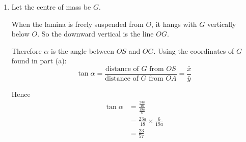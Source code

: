 \documentclass[leqno]{article}
\begin{document}
\begin{enumerate}[
  label=\textbf{\arabic*.},
  leftmargin=*,
  topsep=0pt,
  partopsep=0pt,
  parsep=0pt
]
\begin{djsSolution}
\begin{enumerate}[label=\textbf{(\alph*)}, start=1]
  where \(\mathcal{A}=\sum\mathcal{A}_i\).

  The total area is
  \[
  \mathcal{A}=5a^2+3a^2+a^2=9a^2
  \]

  \begin{enumerate}[label=\textbf{(\roman*)}, start=1]
    \item The distance from \(OS\) is \(\bar x\). Taking moments about \(OS\):
    \begin{align*}
    \mathcal{A}\bar x
    &=5a^2\left(\frac{a}{2}\right)+3a^2\left(\frac{5a}{2}\right)+a^2\left(\frac{3a}{2}\right)\\
    &=\frac{5a^3}{2}+\frac{15a^3}{2}+\frac{3a^3}{2}\\
    &=\frac{23a^3}{2}
    \end{align*}

    So
    \[
    \bar x=\frac{\frac{23a^3}{2}}{9a^2}=\frac{23a}{18}
    \]

    Hence the distance of the centre of mass from \(OS\) is \(\frac{23a}{18}\).

    \item The distance from \(OA\) is \(\bar y\). Taking moments about \(OA\):
    \begin{align*}
    \mathcal{A}\bar y
    &=5a^2\left(\frac{5a}{2}\right)+3a^2\left(\frac{9a}{2}\right)+a^2\left(\frac{5a}{2}\right)\\
    &=\frac{25a^3}{2}+\frac{27a^3}{2}+\frac{5a^3}{2}\\
    &=\frac{57a^3}{2}
    \end{align*}

    So
    \[
    \bar y=\frac{\frac{57a^3}{2}}{9a^2}=\frac{57a}{18}=\frac{19a}{6}
    \]

    Hence the distance of the centre of mass from \(OA\) is \(\frac{19a}{6}\).
  \end{enumerate}

  \item Let the centre of mass be \(G\).

  When the lamina is freely suspended from \(O\), it hangs with \(G\) vertically below \(O\). So the downward vertical is the line \(OG\).

  Therefore \(\alpha\) is the angle between \(OS\) and \(OG\). Using the coordinates of \(G\) found in part (a):
  \[
  \tan\alpha=\frac{\text{distance of }G\text{ from }OS}{\text{distance of }G\text{ from }OA}
  =\frac{\bar x}{\bar y}
  \]

  Hence
  \begin{align*}
  \tan\alpha
  &=\frac{\frac{23a}{18}}{\frac{19a}{6}}\\
  &=\frac{23a}{18}\times\frac{6}{19a}\\
  &=\frac{23}{57}
  \end{align*}
\end{enumerate}
\end{djsSolution}



\end{enumerate}
\end{document}
